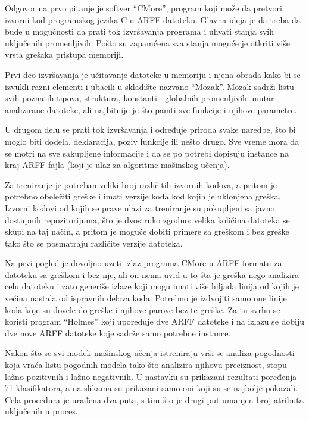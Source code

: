\documentclass[a4paper]{article}
\theoremstyle{definition}
\begin{document}
{Odgovor na prvo pitanje je softver ``CMore'', program koji može da pretvori izvorni kod programskog
jezika C u ARFF datoteku. Glavna ideja je da treba da bude u mogućnosti da prati tok izvršavanja programa
i uhvati stanja svih uključenih promenljivih. Pošto su zapamćena sva stanja moguće je otkriti više vrsta
grešaka pristupa memoriji.

Prvi deo izvršavanja je učitavanje datoteke u memoriju i njena obrada kako bi se izvukli
razni elementi i ubacili u skladište nazvano ``Mozak''.
Mozak sadrži listu svih poznatih tipova, struktura, konstanti i globalnih promenljivih unutar analizirane datoteke,
ali najbitnije je što pamti sve funkcije i njihove parametre.

U drugom delu se prati tok izvršavanja i određuje
priroda svake naredbe, što bi moglo biti dodela, deklaracija, poziv funkcije ili nešto drugo.
Sve vreme mora da se motri na sve sakupljene informacije i da se po potrebi dopisuju instance na kraj ARFF fajla
(koji je ulaz za algoritme mašinskog učenja).


Za treniranje je potreban veliki broj različitih izvornih kodova, a pritom je potrebno obeležiti greške i imati verzije koda kod kojih je uklonjena greška.
Izvorni kodovi od kojih se prave ulazi za treniranje su pokupljeni sa javno dostupnih repozitorijuma, što je dvostruko zgodno:
velika količina datoteka se skupi na taj način, a pritom je moguće dobiti primere sa greškom i bez greške tako što se posmatraju različite verzije datoteka.

Na prvi pogled je dovoljno uzeti izlaz programa CMore u ARFF formatu za datoteku sa greškom i bez nje, ali on nema uvid u to šta je greška nego analizira celu datoteku i zato
generiše izlaze koji mogu imati više hiljada linija od kojih je većina nastala od ispravnih delova koda.
Potrebno je izdvojiti samo one linije koda koje su dovele do greške i njihove parove bez te greške.
Za tu svrhu se koristi program ``Holmes'' koji upoređuje dve ARFF datoteke i na izlazu se dobiju dve nove ARFF datoteke koje sadrže samo potrebne  instance.

Nakon što se svi modeli mašinskog učenja istreniraju vrši se analiza pogodnosti
koja vraća listu pogodnih modela tako što analizira njihovu preciznost, stopu lažno pozitivnih i lažno negativnih.
U nastavku su prikazani rezultati poređenja 71 klasifikatora, a na slikama su prikazani samo oni koji su se najbolje pokazali. Cela procedura je urađena dva puta, s tim što je drugi put umanjen broj atributa uključenih u proces.

}
\end{document}
